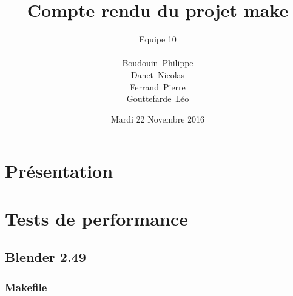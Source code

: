 \documentclass[a4paper, 11pt, titlepage]{article}
\title {{ {\huge Compte rendu du projet make }} }
\author{\Large Equipe 10 \\
\\
    {\sc Boudouin}~Philippe\\
    {\sc Danet}~Nicolas\\
    {\sc Ferrand}~Pierre\\
    {\sc Gouttefarde}~Léo
}
\date{Mardi 22 Novembre 2016}
\begin{document}
\pagestyle{fancy}
\maketitle

\setcounter{tocdepth}{2}

\tableofcontents
\newpage

\section {Présentation}




\newpage

\section {Tests de performance}

\subsection {Blender 2.49}
\subsubsection {Makefile}



\end{document}

